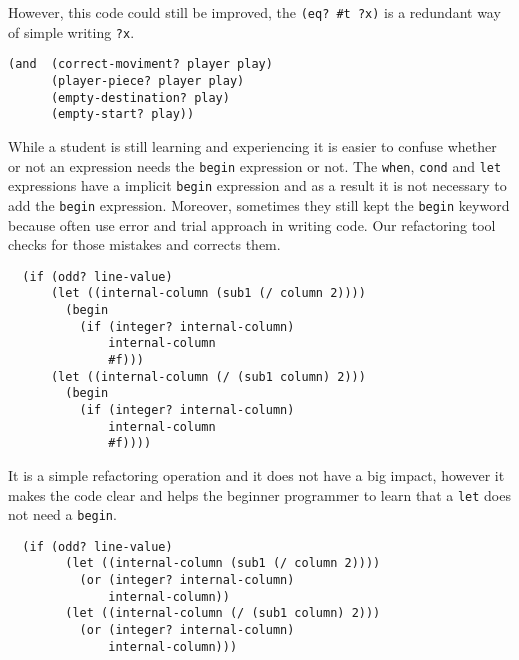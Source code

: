 However, this code could still be improved, the {\tt (eq? \#t ?x)} is a redundant way
of simple writing {\tt ?x}.
\begin{lstlisting}
(and  (correct-moviment? player play)
      (player-piece? player play)
      (empty-destination? play)
      (empty-start? play))
\end{lstlisting}


While a student is still learning and experiencing it is easier to confuse whether
or not an expression needs the {\tt begin} expression or not.
The {\tt when}, {\tt cond} and {\tt let} expressions have a implicit {\tt begin} expression and
as a result it is not necessary to add the {\tt begin} expression.
Moreover, sometimes they still kept the {\tt begin} keyword because often use error and trial approach
in writing code.
Our refactoring tool checks for those mistakes and corrects them.
\begin{lstlisting}
  (if (odd? line-value)
      (let ((internal-column (sub1 (/ column 2))))
        (begin
          (if (integer? internal-column)
              internal-column
              #f)))
      (let ((internal-column (/ (sub1 column) 2)))
        (begin
          (if (integer? internal-column)
              internal-column
              #f))))
\end{lstlisting}
It is a simple refactoring operation and it does not have a big impact, however
it makes the code clear and helps the beginner programmer to learn that a {\tt let}
does not need a {\tt begin}.
\begin{lstlisting}
  (if (odd? line-value)
        (let ((internal-column (sub1 (/ column 2))))
          (or (integer? internal-column)
              internal-column))
        (let ((internal-column (/ (sub1 column) 2)))
          (or (integer? internal-column)
              internal-column)))
\end{lstlisting}


